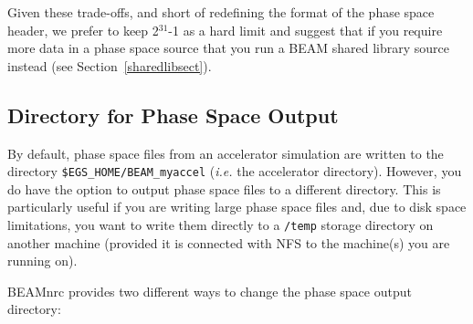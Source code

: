 \documentclass[12pt,twoside]{article}
\begin{document}
Given these trade-offs, and short of redefining the format of the
phase space header, we prefer to keep 2$^{31}$-1 as a hard limit and suggest that if you require
more data in a phase space source that you run a BEAM shared library source
instead (see Section~\ref{sharedlibsect}).

\subsection{Directory for Phase Space Output}
\label{phspoutdirsect}

By default, phase space files from an accelerator simulation are
written to the directory
{\tt \$EGS\_HOME/BEAM\_myaccel} ({\em i.e.} the accelerator
directory).  However, you do have the option to output
phase space files to a different directory.
This is particularly useful if you are writing
large phase space files and, due to disk space limitations, you
want to write them directly to a {\tt /temp} storage directory on
another machine (provided it is connected
with NFS to the machine(s) you are running on).

BEAMnrc provides two different ways to change the phase space output
directory:
\end{document}
